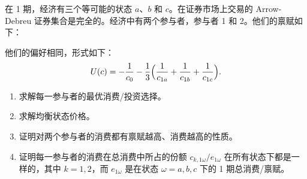 \begin{problem}
 在 1 期，经济有三个等可能的状态 $a$、$b$ 和 $c$。在证券市场上交易的 Arrow-Debreu 证券集合是完全的。经济中有两个参与者，参与者 1 和 2。他们的禀赋如下：
\begin{center}
\qquad
{}
\end{center}
他们的偏好相同，形式如下：
\[
    U(c)=-\frac{1}{c_{0}}-\frac13\Bigl(\frac{1}{c_{1a}}+\frac{1}{c_{1b}}+\frac{1}{c_{1c}}\Bigr).
\]
\begin{enumerate}[label=(\alph*)]
    \item 求解每一参与者的最优消费/投资选择。
    \item 求解均衡状态价格。
    \item 证明对两个参与者的消费都有禀赋越高、消费越高的性质。
    \item 证明每一参与者的消费在总消费中所占的份额 $c_{k,1\omega}/e_{1\omega}$ 在所有状态下都是一样的，其中 $k=1,2$，而 $e_{1\omega}$ 是在状态 $\omega=a,b,c$ 下的 1 期总消费/禀赋。
\end{enumerate}
\end{problem}
